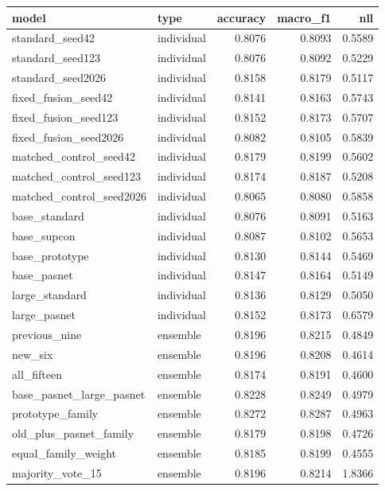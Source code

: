 \begin{tabular}{llrrr}
\toprule
model & type & accuracy & macro\_f1 & nll \\
\midrule
standard\_seed42 & individual & 0.8076 & 0.8093 & 0.5589 \\
standard\_seed123 & individual & 0.8076 & 0.8092 & 0.5229 \\
standard\_seed2026 & individual & 0.8158 & 0.8179 & 0.5117 \\
fixed\_fusion\_seed42 & individual & 0.8141 & 0.8163 & 0.5743 \\
fixed\_fusion\_seed123 & individual & 0.8152 & 0.8173 & 0.5707 \\
fixed\_fusion\_seed2026 & individual & 0.8082 & 0.8105 & 0.5839 \\
matched\_control\_seed42 & individual & 0.8179 & 0.8199 & 0.5602 \\
matched\_control\_seed123 & individual & 0.8174 & 0.8187 & 0.5208 \\
matched\_control\_seed2026 & individual & 0.8065 & 0.8080 & 0.5858 \\
base\_standard & individual & 0.8076 & 0.8091 & 0.5163 \\
base\_supcon & individual & 0.8087 & 0.8102 & 0.5653 \\
base\_prototype & individual & 0.8130 & 0.8144 & 0.5469 \\
base\_pasnet & individual & 0.8147 & 0.8164 & 0.5149 \\
large\_standard & individual & 0.8136 & 0.8129 & 0.5050 \\
large\_pasnet & individual & 0.8152 & 0.8173 & 0.6579 \\
previous\_nine & ensemble & 0.8196 & 0.8215 & 0.4849 \\
new\_six & ensemble & 0.8196 & 0.8208 & 0.4614 \\
all\_fifteen & ensemble & 0.8174 & 0.8191 & 0.4600 \\
base\_pasnet\_large\_pasnet & ensemble & 0.8228 & 0.8249 & 0.4979 \\
prototype\_family & ensemble & 0.8272 & 0.8287 & 0.4963 \\
old\_plus\_pasnet\_family & ensemble & 0.8179 & 0.8198 & 0.4726 \\
equal\_family\_weight & ensemble & 0.8185 & 0.8199 & 0.4555 \\
majority\_vote\_15 & ensemble & 0.8196 & 0.8214 & 1.8366 \\
\bottomrule
\end{tabular}
